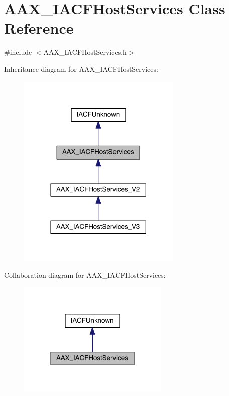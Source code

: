 \hypertarget{a00071}{}\section{A\+A\+X\+\_\+\+I\+A\+C\+F\+Host\+Services Class Reference}
\label{a00071}


{\ttfamily \#include $<$A\+A\+X\+\_\+\+I\+A\+C\+F\+Host\+Services.\+h$>$}



Inheritance diagram for A\+A\+X\+\_\+\+I\+A\+C\+F\+Host\+Services\+:
\nopagebreak
\begin{figure}[H]
\begin{center}
\leavevmode
\includegraphics[width=222pt]{a00556}
\end{center}
\end{figure}


Collaboration diagram for A\+A\+X\+\_\+\+I\+A\+C\+F\+Host\+Services\+:
\nopagebreak
\begin{figure}[H]
\begin{center}
\leavevmode
\includegraphics[width=204pt]{a00557}
\end{center}
\end{figure}


